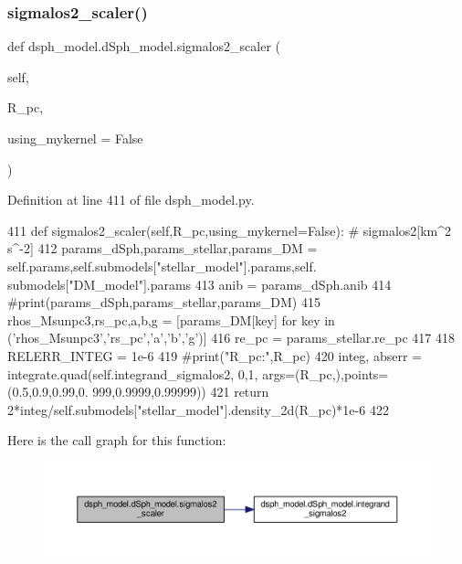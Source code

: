 \subsubsection{\texorpdfstring{sigmalos2\+\_\+scaler()}{sigmalos2\_scaler()}}
{\footnotesize\ttfamily def dsph\+\_\+model.\+d\+Sph\+\_\+model.\+sigmalos2\+\_\+scaler (\begin{DoxyParamCaption}\item[{}]{self,  }\item[{}]{R\+\_\+pc,  }\item[{}]{using\+\_\+mykernel = {\ttfamily False} }\end{DoxyParamCaption})}



Definition at line 411 of file dsph\+\_\+model.\+py.


\begin{DoxyCode}
411     \textcolor{keyword}{def }sigmalos2\_scaler(self,R\_pc,using\_mykernel=False): \textcolor{comment}{# sigmalos2[km^2 s^-2] }
412         params\_dSph,params\_stellar,params\_DM = self.params,self.submodels[\textcolor{stringliteral}{"stellar\_model"}].params,self.
      submodels[\textcolor{stringliteral}{"DM\_model"}].params
413         anib = params\_dSph.anib
414         \textcolor{comment}{#print(params\_dSph,params\_stellar,params\_DM)}
415         rhos\_Msunpc3,rs\_pc,a,b,g = [params\_DM[key] \textcolor{keywordflow}{for} key \textcolor{keywordflow}{in} (\textcolor{stringliteral}{'rhos\_Msunpc3'},\textcolor{stringliteral}{'rs\_pc'},\textcolor{stringliteral}{'a'},\textcolor{stringliteral}{'b'},\textcolor{stringliteral}{'g'})]
416         re\_pc = params\_stellar.re\_pc
417 
418         RELERR\_INTEG = 1e-6
419         \textcolor{comment}{#print("R\_pc:",R\_pc)}
420         integ, abserr =  integrate.quad(self.integrand\_sigmalos2, 0,1, args=(R\_pc,),points=(0.5,0.9,0.99,0.
      999,0.9999,0.99999))
421         \textcolor{keywordflow}{return} 2*integ/self.submodels[\textcolor{stringliteral}{"stellar\_model"}].density\_2d(R\_pc)*1e-6
422     
\end{DoxyCode}
Here is the call graph for this function\+:\nopagebreak
\begin{figure}[H]
\begin{center}
\leavevmode
\includegraphics[width=350pt]{d0/d25/classdsph__model_1_1dSph__model_a05b988f7553121226a4d08369c44b4fa_cgraph}
\end{center}
\end{figure}
